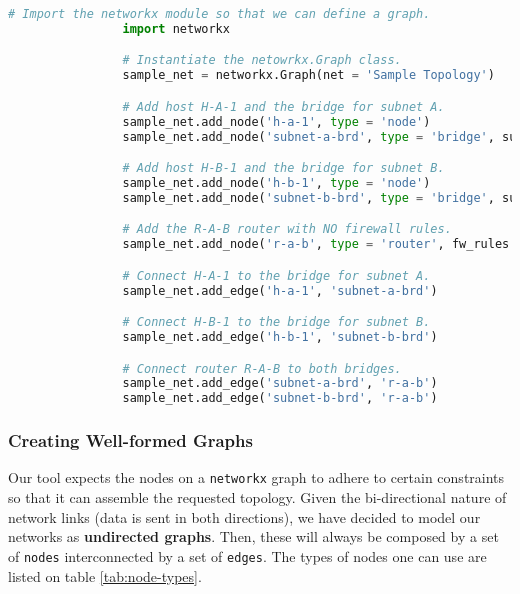             \begin{lstlisting}[language = python, caption = Defining the Sample Topology as a \texttt{networkx} graph., label = lst:sample-topology-graph]
                # Import the networkx module so that we can define a graph.
                import networkx

                # Instantiate the netowrkx.Graph class.
                sample_net = networkx.Graph(net = 'Sample Topology')

                # Add host H-A-1 and the bridge for subnet A.
                sample_net.add_node('h-a-1', type = 'node')
                sample_net.add_node('subnet-a-brd', type = 'bridge', subnet = '10.0.0.0/24')

                # Add host H-B-1 and the bridge for subnet B.
                sample_net.add_node('h-b-1', type = 'node')
                sample_net.add_node('subnet-b-brd', type = 'bridge', subnet = '10.0.1.0/24')

                # Add the R-A-B router with NO firewall rules.
                sample_net.add_node('r-a-b', type = 'router', fw_rules = {})

                # Connect H-A-1 to the bridge for subnet A.
                sample_net.add_edge('h-a-1', 'subnet-a-brd')

                # Connect H-B-1 to the bridge for subnet B.
                sample_net.add_edge('h-b-1', 'subnet-b-brd')

                # Connect router R-A-B to both bridges.
                sample_net.add_edge('subnet-a-brd', 'r-a-b')
                sample_net.add_edge('subnet-b-brd', 'r-a-b')
            \end{lstlisting}

            \subsubsection{Creating Well-formed Graphs} \label{sec:good-graphs}
                Our tool expects the nodes on a \texttt{networkx} graph to adhere to certain constraints so that it can assemble the requested topology. Given the bi-directional nature of network links (data is sent in both directions), we have decided to model our networks as \textbf{undirected graphs}. Then, these will always be composed by a set of \texttt{nodes} interconnected by a set of \texttt{edges}. The types of nodes one can use are listed on table \ref{tab:node-types}.\\

